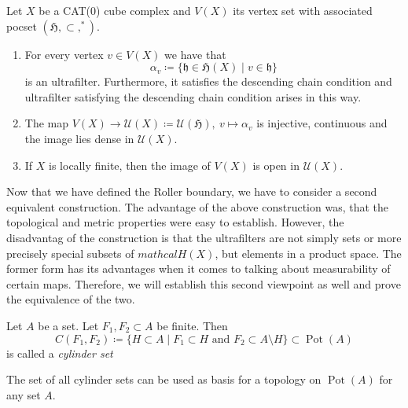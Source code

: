 \begin{thm}
  Let \(X\) be a CAT(0) cube complex and \(V(X)\) its vertex set with associated pocset \((\mathfrak{H}, \subset, ^\ast)\).
  \begin{enumerate}
  \item For every vertex \(v \in V(X)\) we have that
    \[
      \alpha_v \coloneqq \{\mathfrak{h} \in \mathfrak{H}(X) \mid v \in \mathfrak{h}\}
    \]
    is an ultrafilter. Furthermore, it satisfies the descending chain condition and ultrafilter satisfying the descending chain condition arises in this way.
  \item The map \(V(X) \to \mathcal{U}(X) \coloneqq \mathcal{U}(\mathfrak{H}),\ v \mapsto \alpha_v\) is injective, continuous and the image lies dense in \(\mathcal{U}(X)\). 
  \item If \(X\) is locally finite, then the image of \(V(X)\) is open in \(\mathcal{U}(X)\).
  \end{enumerate}
\end{thm}

Now that we have defined the Roller boundary, we have to consider a second equivalent construction. The advantage of the above construction was, that the topological and metric properties were easy to establish. However, the disadvantag of the construction is that the ultrafilters are not simply sets or more precisely special subsets of \(mathcal{H}(X)\), but elements in a product space. The former form has its advantages when it comes to talking about measurability of certain maps. Therefore, we will establish this second viewpoint as well and prove the equivalence of the two.

\begin{defin}
  Let \(A\) be a set. Let \(F_1, F_2 \subset A\) be finite. Then
  \[
    C(F_1, F_2) \coloneqq \{ H \subset A \mid F_1 \subset H \text{ and } F_2 \subset A \setminus H\} \subset \operatorname{Pot}(A)
  \]
  is called a \emph{cylinder set}
\end{defin}

\begin{prop}
  The set of all cylinder sets can be used as basis for a topology on \(\operatorname{Pot}(A)\) for any set \(A\).
\end{prop}

